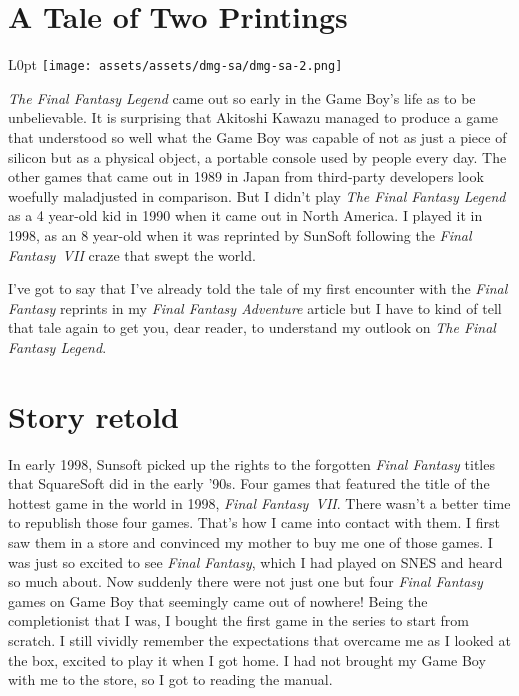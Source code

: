 \documentclass{book}
\begin{document}
\newpage\FloatBarrier\needspace{10mm}\section*{A Tale of Two Printings}\nopagebreak[4]
\begin{wrapfigure}{L}{0pt} \texttt{[image: assets/assets/dmg-sa/dmg-sa-2.png]}\end{wrapfigure}
\emph{The Final Fantasy Legend} came out so early in the Game Boy’s life as to be unbelievable. It is surprising that Akitoshi Kawazu managed to produce a game that understood so well what the Game Boy was capable of not as just a piece of silicon but as a physical object, a portable console used by people every day. The other games that came out in 1989 in Japan from third-party developers look woefully maladjusted in comparison. But I didn’t play \emph{The Final Fantasy Legend} as a 4 year-old kid in 1990 when it came out in North America. I played it in 1998, as an 8 year-old when it was reprinted by SunSoft following the \emph{Final Fantasy~VII} craze that swept the world.

I’ve got to say that I’ve already told the tale of my first encounter with the \emph{Final Fantasy} reprints in my \emph{Final Fantasy Adventure} article but I have to kind of tell that tale again to get you, dear reader, to understand my outlook on \emph{The Final Fantasy Legend}.

\FloatBarrier\needspace{10mm}\section*{Story retold}\nopagebreak[4]

In early 1998, Sunsoft picked up the rights to the forgotten \emph{Final Fantasy} titles that SquareSoft did in the early ’90s. Four games that featured the title of the hottest game in the world in 1998, \emph{Final Fantasy~VII}. There wasn’t a better time to republish those four games. That’s how I came into contact with them. I first saw them in a store and convinced my mother to buy me one of those games. I was just so excited to see \emph{Final Fantasy}, which I had played on SNES and heard so much about. Now suddenly there were not just one but four \emph{Final Fantasy} games on Game Boy that seemingly came out of nowhere! Being the completionist that I was, I bought the first game in the series to start from scratch. I still vividly remember the expectations that overcame me as I looked at the box, excited to play it when I got home. I had not brought my Game Boy with me to the store, so I got to reading the manual.
\end{document}
